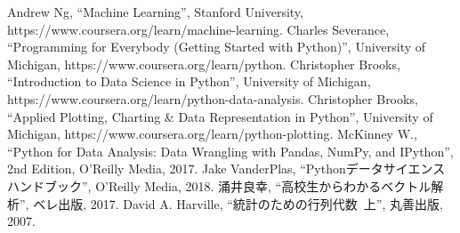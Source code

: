 \begin{thebibliography}{99}
 Andrew Ng, ``Machine Learning'', Stanford University, https://www.coursera.org/learn/machine-learning.
 Charles Severance, ``Programming for Everybody (Getting Started with Python)'', University of Michigan, https://www.coursera.org/learn/python.
 Christopher Brooks, ``Introduction to Data Science in Python'', University of Michigan, https://www.coursera.org/learn/python-data-analysis.
 Christopher Brooks, ``Applied Plotting, Charting \& Data Representation in Python'', University of Michigan, https://www.coursera.org/learn/python-plotting.
 McKinney W., ``Python for Data Analysis: Data Wrangling with Pandas, NumPy, and IPython'', 2nd Edition, O'Reilly Media, 2017.
 Jake VanderPlas, ``Pythonデータサイエンスハンドブック'', O'Reilly Media, 2018.
 涌井良幸, ``高校生からわかるベクトル解析'', ベレ出版, 2017.
 David A. Harville, ``統計のための行列代数~上'', 丸善出版, 2007.
\end{thebibliography}